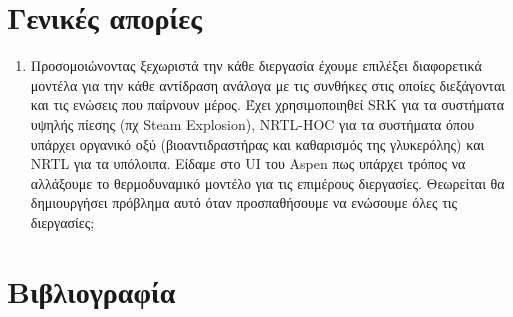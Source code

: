 \documentclass[11pt]{article}
\begin{document}
\section{Γενικές απορίες}
\label{sec:org7bf68fe}
\begin{enumerate}
\item Προσομοιώνοντας ξεχωριστά την κάθε διεργασία έχουμε επιλέξει διαφορετικά μοντέλα για την κάθε αντίδραση ανάλογα με τις συνθήκες στις οποίες διεξάγονται και τις ενώσεις που παίρνουν μέρος. Έχει χρησιμοποιηθεί SRK για τα συστήματα υψηλής πίεσης (πχ Steam Explosion), NRTL-HOC για τα συστήματα όπου υπάρχει οργανικό οξύ (βιοαντιδραστήρας και καθαρισμός της γλυκερόλης) και NRTL για τα υπόλοιπα. Είδαμε στο UI του Aspen πως υπάρχει τρόπος να αλλάξουμε το θερμοδυναμικό μοντέλο για τις επιμέρους διεργασίες. Θεωρείται θα δημιουργήσει πρόβλημα αυτό όταν προσπαθήσουμε να ενώσουμε όλες τις διεργασίες;
\end{enumerate}

\section{Βιβλιογραφία}
\label{sec:org73df5da}


\end{document}
